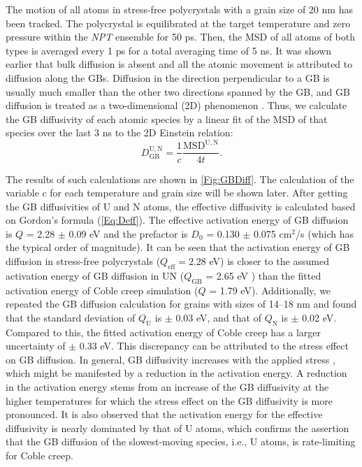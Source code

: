 \documentclass[preprint,12pt,sort&compress]{elsarticle}
\newcommand{\?}{\stackrel{?}{=}}
\begin{document}
The motion of all atoms in stress-free polycrystals with a grain size of 20 nm has been tracked. The polycrystal is equilibrated at the target temperature and zero pressure within the \textit{NPT} ensemble for 50 ps. Then, the MSD of all atoms of both types is averaged every 1 ps for a total averaging time of 5 ns. It was shown earlier that bulk diffusion is absent and all the atomic movement is attributed to diffusion along the GBs. Diffusion in the direction perpendicular to a GB is usually much smaller than the other two directions spanned by the GB, and GB diffusion is treated as a two-dimensional (2D) phenomenon \cite{Riet2021}. Thus, we calculate the GB diffusivity of each atomic species by a linear fit of the MSD of that species over the last 3 ns to the 2D Einstein relation:
\begin{equation}
D_\mathrm{GB}^\mathrm{U, N} = \frac{1}{c} \frac{\mathrm{MSD^\mathrm{U, N}}}{4 t}.
\label{Eq:GBD}
\end{equation}

The results of such calculations are shown in \cref{Fig:GBDiff}. The calculation of the variable $c$ for each temperature and grain size will be shown later. After getting the GB diffusivities of U and N atoms, the effective diffusivity is calculated based on Gordon's formula (\cref{Eq:Deff}). The effective activation energy of GB diffusion is $Q$ = 2.28 $\pm$ 0.09 eV and the prefactor is $D_0$ = 0.130 $\pm$ 0.075 cm$^2$/s (which has the typical order of magnitude). It can be seen that the activation energy of GB diffusion in stress-free polycrystals ($Q_{\mathrm{eff}} = 2.28$ eV) is closer to the assumed activation energy of GB diffusion in UN ($Q_\mathrm{GB}$ = 2.65 eV \cite{Konovalov2016}) than the fitted activation energy of Coble creep simulation ($Q$ = 1.79 eV). Additionally, we repeated the GB diffusion calculation for grains with sizes of 14--18 nm and found that the standard deviation of $Q_\mathrm{U}$ is $\pm$ 0.03 eV, and that of $Q_\mathrm{N}$ is $\pm$ 0.02 eV. Compared to this, the fitted activation energy of Coble creep has a larger uncertainty of $\pm$ 0.33 eV. This discrepancy can be attributed to the stress effect on GB diffusion. In general, GB diffusivity increases with the applied stress \cite{Haslam2004}, which might be manifested by a reduction in the activation energy. A reduction in the activation energy stems from an increase of the GB diffusivity at the higher temperatures for which the stress effect on the GB diffusivity is more pronounced. It is also observed that the activation energy for the effective diffusivity is nearly dominated by that of U atoms, which confirms the assertion that the GB diffusion of the slowest-moving species, i.e., U atoms, is rate-limiting for Coble creep. 
\end{document}
